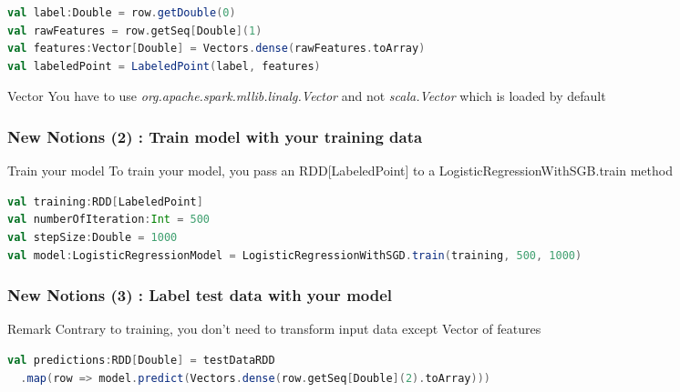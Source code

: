 \documentclass[slidetop,9pt,utf8]{beamer}
\begin{document}
\begin{CJK}{UTF8}{gbsn}
\begin{frame}[fragile]
\begin{lstlisting}[label=TransformDataToLinearRegression, caption=Transform row into LabeledPoint, language=scala, style=code]
val label:Double = row.getDouble(0)
val rawFeatures = row.getSeq[Double](1)
val features:Vector[Double] = Vectors.dense(rawFeatures.toArray)
val labeledPoint = LabeledPoint(label, features)
  \end{lstlisting}

\begin{alertblock}{Vector}
  You have to use \textit{org.apache.spark.mllib.linalg.Vector} and not \textit{scala.Vector} which is loaded by default
\end{alertblock}

\end{frame}

\begin{frame}[fragile]
  \frametitle{New Notions (2) : Train model with your training data}

  \begin{block}{Train your model}
    To train your model, you pass an RDD[LabeledPoint] to a LogisticRegressionWithSGB.train method
  \end{block}

  \begin{lstlisting}[label=TrainModel, caption=Train your model, language=scala, style=code]
val training:RDD[LabeledPoint]
val numberOfIteration:Int = 500
val stepSize:Double = 1000
val model:LogisticRegressionModel = LogisticRegressionWithSGD.train(training, 500, 1000)
  \end{lstlisting}


\end{frame}

\begin{frame}[fragile]
  \frametitle{New Notions (3) : Label test data with your model}

  \begin{block}{Remark}
    Contrary to training, you don't need to transform input data except Vector of features
  \end{block}

  \begin{lstlisting}[label=TransformDataToLinearRegression, caption=Transform row into LabeledPoint, language=scala, style=code]
val predictions:RDD[Double] = testDataRDD
  .map(row => model.predict(Vectors.dense(row.getSeq[Double](2).toArray)))
  \end{lstlisting}

\end{frame}

\begin{frame}


\end{frame}
\end{CJK}
\end{document}
